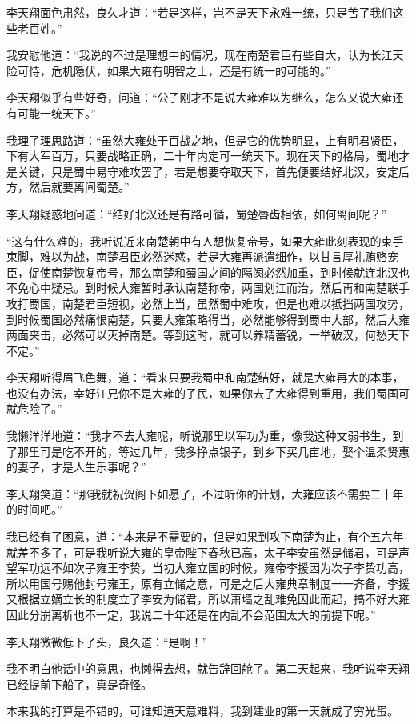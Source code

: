 李天翔面色肃然，良久才道：“若是这样，岂不是天下永难一统，只是苦了我们这些老百姓。”

我安慰他道：“我说的不过是理想中的情况，现在南楚君臣有些自大，认为长江天险可恃，危机隐伏，如果大雍有明智之士，还是有统一的可能的。”

李天翔似乎有些好奇，问道：“公子刚才不是说大雍难以为继么，怎么又说大雍还有可能一统天下。”

我理了理思路道：“虽然大雍处于百战之地，但是它的优势明显，上有明君贤臣，下有大军百万，只要战略正确，二十年内定可一统天下。现在天下的格局，蜀地才是关键，只是蜀中易守难攻罢了，若是想要夺取天下，首先便要结好北汉，安定后方，然后就要离间蜀楚。”

李天翔疑惑地问道：“结好北汉还是有路可循，蜀楚唇齿相依，如何离间呢？”

“这有什么难的，我听说近来南楚朝中有人想恢复帝号，如果大雍此刻表现的束手束脚，难以为战，南楚君臣必然迷惑，若是大雍再派遣细作，以甘言厚礼贿赂宠臣，促使南楚恢复帝号，那么南楚和蜀国之间的隔阂必然加重，到时候就连北汉也不免心中疑忌。到时候大雍暂时承认南楚称帝，两国划江而治，然后再和南楚联手攻打蜀国，南楚君臣短视，必然上当，虽然蜀中难攻，但是也难以抵挡两国攻势，到时候蜀国必然痛恨南楚，只要大雍策略得当，必然能够得到蜀中大部，然后大雍两面夹击，必然可以灭掉南楚。等到这时，就可以养精蓄锐，一举破汉，何愁天下不定。”

李天翔听得眉飞色舞，道：“看来只要我蜀中和南楚结好，就是大雍再大的本事，也没有办法，幸好江兄你不是大雍的子民，如果你去了大雍得到重用，我们蜀国可就危险了。”

我懒洋洋地道：“我才不去大雍呢，听说那里以军功为重，像我这种文弱书生，到了那里可是吃不开的，等过几年，我多挣点银子，到乡下买几亩地，娶个温柔贤惠的妻子，才是人生乐事呢？”

李天翔笑道：“那我就祝贺阁下如愿了，不过听你的计划，大雍应该不需要二十年的时间吧。”

我已经有了困意，道：“本来是不需要的，但是如果到攻下南楚为止，有个五六年就差不多了，可是我听说大雍的皇帝陛下春秋已高，太子李安虽然是储君，可是声望军功远不如次子雍王李贽，当初大雍立国的时候，雍帝李援因为次子李贽功高，所以用国号赐他封号雍王，原有立储之意，可是之后大雍典章制度一一齐备，李援又根据立嫡立长的制度立了李安为储君，所以萧墙之乱难免因此而起，搞不好大雍因此分崩离析也不一定，我说二十年还是在内乱不会范围太大的前提下呢。”

李天翔微微低下了头，良久道：“是啊！”

我不明白他话中的意思，也懒得去想，就告辞回舱了。第二天起来，我听说李天翔已经提前下船了，真是奇怪。

本来我的打算是不错的，可谁知道天意难料，我到建业的第一天就成了穷光蛋。

